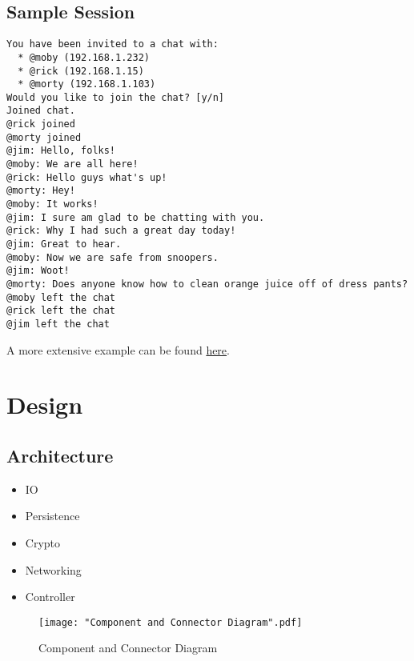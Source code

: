 \documentclass{scrartcl}
\begin{document}
\subsection{Sample Session}
\begin{lstlisting}
You have been invited to a chat with:
  * @moby (192.168.1.232)
  * @rick (192.168.1.15)
  * @morty (192.168.1.103)
Would you like to join the chat? [y/n]
Joined chat.
@rick joined
@morty joined
@jim: Hello, folks!
@moby: We are all here!
@rick: Hello guys what's up!
@morty: Hey!
@moby: It works!
@jim: I sure am glad to be chatting with you.
@rick: Why I had such a great day today!
@jim: Great to hear.
@moby: Now we are safe from snoopers.
@jim: Woot!
@morty: Does anyone know how to clean orange juice off of dress pants?
@moby left the chat
@rick left the chat
@jim left the chat
\end{lstlisting}

A more extensive example can be found  \href{https://asciinema.org/a/e9isbc0pb8ww5i36jjpck3dz6}{here}.

\section{Design}
\subsection{Architecture}
\begin{itemize}
	\item IO
	\item Persistence
	\item Crypto
	\item Networking
	\item Controller
\end{itemize}

\begin{figure}[H]
	\texttt{[image: "Component and Connector Diagram".pdf]}
	\caption{Component and Connector Diagram}
\end{figure}
\end{document}
